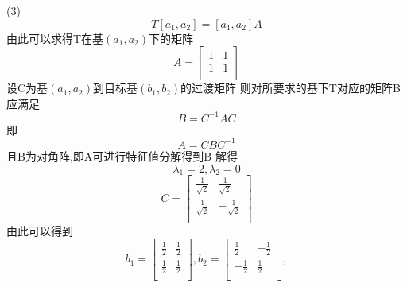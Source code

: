 \documentclass[UTF8]{uofa-eng-assignment}
\begin{document}
\begin{enumerate}
(3)
$$T[a_1,a_2]=[a_1,a_2]A$$
由此可以求得T在基$(a_1,a_2)$下的矩阵
$$
A=\left[
        \begin{matrix}
            1&1\\
            1&1\\
\end{matrix}\right]
$$
设C为基$(a_1,a_2)$到目标基$(b_1,b_2)$的过渡矩阵
则对所要求的基下T对应的矩阵B应满足
$$B=C^{-1}AC$$
即
$$A=CBC^{-1}$$且B为对角阵,即A可进行特征值分解得到B
解得
$$
\lambda_1=2,\lambda_2=0
$$
$$
C=\left[
        \begin{matrix}
            \frac{1}{\sqrt{2}}&\frac{1}{\sqrt{2}}\\
            \frac{1}{\sqrt{2}}&-\frac{1}{\sqrt{2}}\\
\end{matrix}\right]
$$
由此可以得到
$$
b_1=\left[
        \begin{matrix}
            \frac{1}{2}&\frac{1}{2}\\
            \frac{1}{2}&\frac{1}{2}\\
        \end{matrix}\right],
b_2=\left[
        \begin{matrix}
            \frac{1}{2}&-\frac{1}{2}\\
            -\frac{1}{2}&\frac{1}{2}\\
        \end{matrix}\right],
$$
\end{enumerate}
\end{document}
